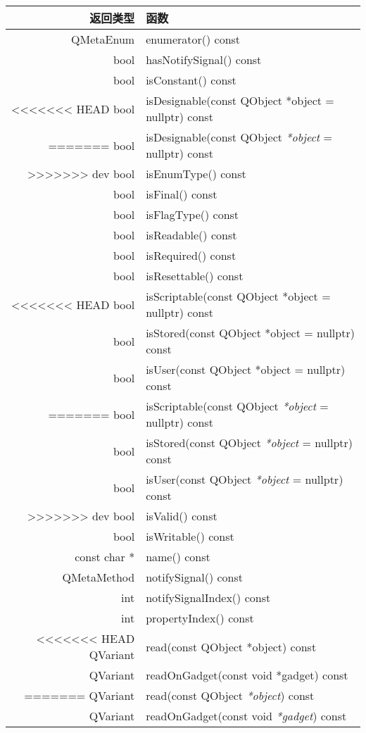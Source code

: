 \begin{longtable}{|r|m{28em}|}   
\hline
返回类型 	& 函数 \\
\hline
QMetaEnum &	enumerator() const \\
\hline 
bool &	hasNotifySignal() const \\ 
\hline
bool &	isConstant() const \\ 
\hline
<<<<<<< HEAD
bool &	isDesignable(const QObject *object = nullptr) const \\
=======
bool &	isDesignable(const QObject \emph{*object} = nullptr) const \\
>>>>>>> dev
\hline
bool &	isEnumType() const \\
\hline
bool 	&isFinal() const \\ 
\hline
bool 	&isFlagType() const \\ 
\hline
bool &	isReadable() const \\ 
\hline
bool &	isRequired() const\\
\hline
bool &	isResettable() const\\
\hline
<<<<<<< HEAD
bool &	isScriptable(const QObject *object = nullptr) const\\
\hline
bool 	&isStored(const QObject *object = nullptr) const\\
\hline
bool 	&isUser(const QObject *object = nullptr) const\\
=======
bool &	isScriptable(const QObject \emph{*object} = nullptr) const\\
\hline
bool 	&isStored(const QObject \emph{*object} = nullptr) const\\
\hline
bool 	&isUser(const QObject \emph{*object} = nullptr) const\\
>>>>>>> dev
\hline
bool &	isValid() const\\
\hline
bool 	&isWritable() const\\
\hline
const char * &	name() const\\
\hline
QMetaMethod &	notifySignal() const\\
\hline
int 	& notifySignalIndex() const\\
\hline
int  &	propertyIndex() const\\
\hline
<<<<<<< HEAD
QVariant &	read(const QObject *object) const \\
\hline
QVariant 	&readOnGadget(const void *gadget) const \\
=======
QVariant &	read(const QObject \emph{*object}) const \\
\hline
QVariant 	&readOnGadget(const void \emph{*gadget}) const \\

\end{longtable}

